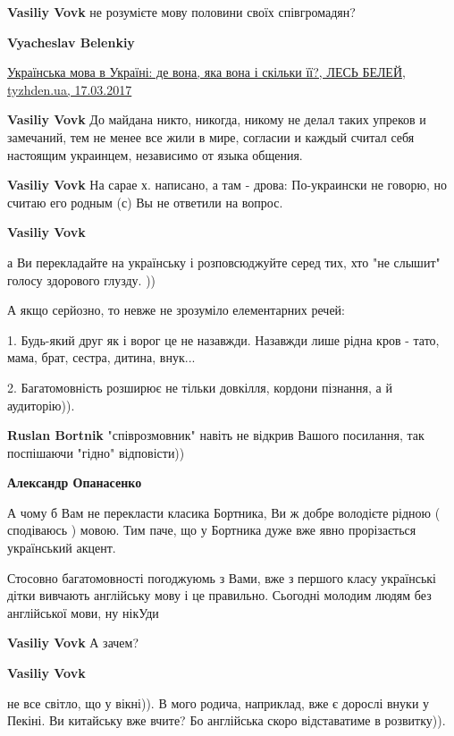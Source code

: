 \begin{itemize}
\begin{itemize}
\textbf{Vasiliy Vovk}
не розумієте мову половини своїх співгромадян?

\textbf{Vyacheslav Belenkiy} 

\href{https://tyzhden.ua/Society/187865}{%
Українська мова в Україні: де вона, яка вона і скільки її?, ЛЕСЬ БЕЛЕЙ, tyzhden.ua, 17.03.2017%
}

\textbf{Vasiliy Vovk} До майдана никто, никогда, никому не делал таких упреков и замечаний, тем не менее все жили в мире, согласии и каждый считал себя настоящим украинцем, независимо от языка общения.

\textbf{Vasiliy Vovk}
На сарае х. написано, а там - дрова:
По-украински не говорю, но считаю его родным (с)
Вы не ответили на вопрос.

\textbf{Vasiliy Vovk} 

а Ви перекладайте на українську і розповсюджуйте серед тих, хто "не слышит"
голосу здорового глузду. ))

А якщо серйозно, то невже не зрозуміло елементарних речей:

1. Будь-який друг як і ворог це не назавжди. Назавжди лише рідна кров - тато,
мама, брат, сестра, дитина, внук... 

2. Багатомовність розширює не тільки довкілля, кордони пізнання, а й
аудиторію)).



\textbf{Ruslan Bortnik} "співрозмовник" навіть не відкрив Вашого посилання, так поспішаючи "гідно" відповісти))

\textbf{Александр Опанасенко} 

А чому б Вам не перекласти класика Бортника, Ви ж добре володієте рідною (
сподіваюсь ) мовою. Тим паче, що у Бортника дуже вже явно прорізається
український акцент.

Стосовно багатомовності погоджуюмь з Вами, вже з першого класу українські дітки
вивчають англійську мову і це правильно. Сьогодні молодим людям без англійської
мови, ну нікУди

\textbf{Vasiliy Vovk} А зачем?

\textbf{Vasiliy Vovk} 

не все світло, що у вікні)). В мого родича, наприклад, вже є дорослі внуки у
Пекіні. Ви китайську вже вчите? Бо англійська скоро відставатиме в розвитку)).


\end{itemize}
\end{itemize}
